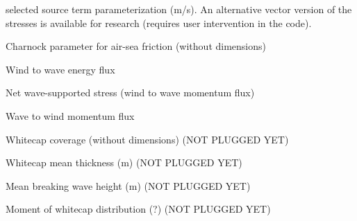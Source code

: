 \begin{list}{)\hfill}
      selected source term parameterization (m/s). An alternative vector version
      of the stresses is available for research (requires user intervention in
      the code).
\item Charnock parameter for air-sea friction (without dimensions)
\item Wind to wave energy flux
\item Net wave-supported stress (wind to wave momentum flux) 
\item Wave to wind momentum flux
\item Whitecap coverage (without dimensions) (NOT PLUGGED YET)
\item Whitecap mean thickness (m) (NOT PLUGGED YET)
\item Mean breaking wave height (m) (NOT PLUGGED YET)
\item Moment of whitecap distribution (?) (NOT PLUGGED YET)


\end{list}
